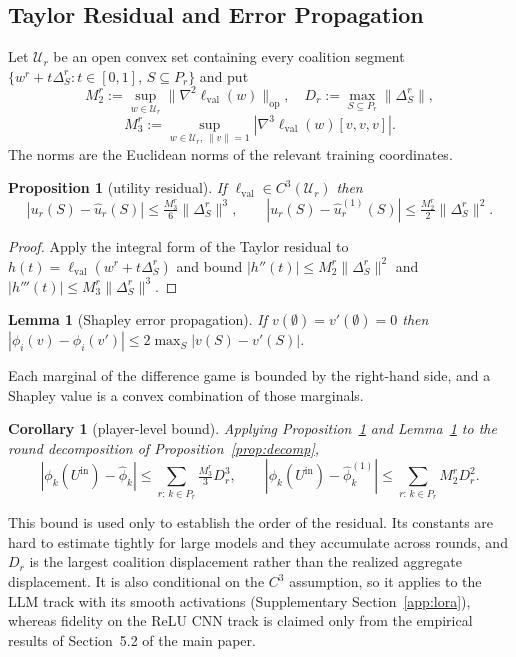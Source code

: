\documentclass[letterpaper]{article} %
\theoremstyle{plain}
\newtheorem{proposition}{Proposition}
\newtheorem{lemma}{Lemma}
\newtheorem{corollary}{Corollary}
\newcommand{\lval}{\ell_{\mathrm{val}}}
\begin{document}
\subsection{Taylor Residual and Error Propagation}
\label{app:residual}

Let $\mathcal U_r$ be an open convex set containing every coalition segment
$\{w^r + t\Delta_S^r : t \in [0,1],\, S \subseteq P_r\}$ and put
\[
M_2^r := \sup_{w \in \mathcal U_r}\|\nabla^2\lval(w)\|_{\mathrm{op}}, \quad
D_r := \max_{S \subseteq P_r}\|\Delta_S^r\|,
\]
\[
M_3^r := \sup_{w \in \mathcal U_r,\, \|v\| = 1}
|\nabla^3\lval(w)[v,v,v]|.
\]
The norms are the Euclidean norms of the relevant training coordinates.

\begin{proposition}[utility residual]
\label{prop:residual}
If $\lval \in C^3(\mathcal U_r)$ then
\[
|u_r(S) - \hat u_r(S)| \le \tfrac{M_3^r}{6}\|\Delta_S^r\|^3, \qquad
|u_r(S) - \hat u_r^{(1)}(S)| \le \tfrac{M_2^r}{2}\|\Delta_S^r\|^2.
\]
\end{proposition}

\begin{proof}
Apply the integral form of the Taylor residual to
$h(t) = \lval(w^r + t\Delta_S^r)$ and bound
$|h''(t)| \le M_2^r\|\Delta_S^r\|^2$ and
$|h'''(t)| \le M_3^r\|\Delta_S^r\|^3$.
\end{proof}

\begin{lemma}[Shapley error propagation]
\label{lem:prop}
If $v(\emptyset) = v'(\emptyset) = 0$ then
$|\phi_i(v) - \phi_i(v')| \le 2\max_S |v(S) - v'(S)|$.
\end{lemma}

Each marginal of the difference game is bounded by the right-hand side, and a
Shapley value is a convex combination of those marginals.

\begin{corollary}[player-level bound]
\label{cor:player}
Applying Proposition~\ref{prop:residual} and Lemma~\ref{lem:prop} to the
round decomposition of Proposition~\ref{prop:decomp},
\[
|\phi_k(U^{\mathrm{in}}) - \hat\phi_k|
\le \sum_{r:\,k \in P_r} \tfrac{M_3^r}{3} D_r^3, \qquad
|\phi_k(U^{\mathrm{in}}) - \hat\phi_k^{(1)}|
\le \sum_{r:\,k \in P_r} M_2^r D_r^2.
\]
\end{corollary}

This bound is used only to establish the order of the residual. Its constants
are hard to estimate tightly for large models and they accumulate across
rounds, and $D_r$ is the largest coalition displacement rather than the
realized aggregate displacement. It is also conditional on the $C^3$
assumption, so it applies to the LLM track with its smooth activations
(Supplementary Section~\ref{app:lora}), whereas fidelity on the ReLU CNN
track is claimed only from the empirical results of Section~5.2 of the main
paper.
\end{document}
